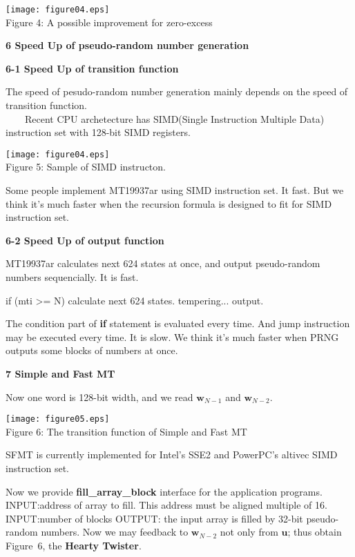 \documentclass[a4j,12pt,landscape]{jarticle}
\def\bw{{{\mathbf w}}}
\def\bu{{{\mathbf u}}}
\begin{document}
\begin{center}
\texttt{[image: figure04.eps]}
\\
Figure 4: A possible improvement for zero-excess
\end{center}

\newpage
\noindent
{\bf 6 Speed Up of pseudo-random number generation}

{\bf 6-1 Speed Up of transition function}

The speed of pesudo-random number generation mainly depends on
the speed of transition function.\\
~~~~Recent CPU archetecture has SIMD(Single Instruction Multiple
Data) instruction set with 128-bit SIMD registers.

\begin{center}
\texttt{[image: figure04.eps]}
\\
Figure 5: Sample of SIMD instructon.
\end{center}
Some people implement MT19937ar using SIMD instruction set.
It fast. But we think it's much faster when the recursion formula is
designed to fit for SIMD instruction set.

\newpage
{\bf 6-2 Speed Up of output function}

MT19937ar calculates next 624 states at once,
and output pseudo-random numbers sequencially.
It is fast. 

if (mti >= N) {
  calculate next 624 states.
}
tempering...
output.

The condition part of {\bf if} statement is evaluated every time.
And jump instruction may be executed every time.
It is slow.
We think it's much faster when PRNG outputs
some blocks of numbers at once.

\newpage
\noindent
{\bf 7 Simple and Fast MT}

Now one word is 128-bit width,
and we read $\bw_{N-1}$ and $\bw_{N-2}$.

\begin{center}
\texttt{[image: figure05.eps]}
\\
Figure 6: The transition function of Simple and Fast MT
\\
\end{center}
SFMT is currently implemented for Intel's SSE2 and PowerPC's altivec SIMD
instruction set.

\newpage
Now we provide {\bf fill\_array\_block} interface for the application programs.
INPUT:address of array to fill. This address must be aligned multiple of 16.
INPUT:number of blocks
OUTPUT: the input array is filled by 32-bit pseudo-random numbers.
Now we may feedback to $\bw_{N-2}$ not only from $\bu$;
thus obtain Figure~6, the {\bf Hearty Twister}.
\end{document}
